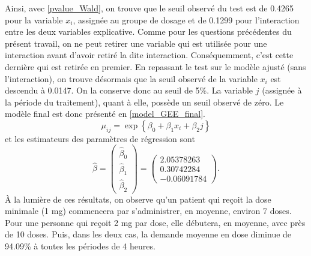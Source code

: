 \documentclass{article}
\begin{document}
	Ainsi, avec \eqref{pvalue_Wald}, on trouve que le seuil observé du test est de 0.4265 pour la variable $x_i$, assignée au groupe de dosage et de 0.1299 pour l'interaction entre les deux variables explicative.
	Comme pour les questions précédentes du présent travail, on ne peut retirer une variable qui est utilisée pour une interaction avant d'avoir retiré la dite interaction. Conséquemment, c'est cette dernière qui est retirée en premier. En repassant le test sur le modèle ajusté (sans l'interaction), on trouve désormais que la seuil observé de la variable $x_i$ est descendu à 0.0147. On la conserve donc au seuil de 5\%. La variable $j$ (assignée à la période du traitement), quant à elle, possède un seuil observé de zéro. 
	Le modèle final est donc présenté en \eqref{model_GEE_final}.
	\begin{equation}\label{model_GEE_final}
		\mu_{ij} = \exp\left\{\beta_0 + \beta_1 x_i + \beta_2 j\right\}
	\end{equation}
	et les estimateurs des paramètres de régression sont 
	$$
	\hat{\beta} =
	 \begin{pmatrix}
		\hat{\beta}_0 \\ 
		\hat{\beta}_1 \\
		\hat{\beta}_2
	\end{pmatrix}
	 = \begin{pmatrix}
		2.05378263  \\
		0.30742284 \\
		-0.06091784
	\end{pmatrix}.
	$$
	À la lumière de ces résultats, on observe qu'un patient qui reçoit la dose minimale (1 mg) commencera par s'administrer, en moyenne, environ 7 doses. Pour une personne qui reçoit 2 mg par dose, elle débutera, en moyenne, avec près de 10 doses.
	Puis, dans les deux cas, la demande moyenne en dose diminue de 94.09\% à toutes les périodes de 4 heures.

	
\end{document}
